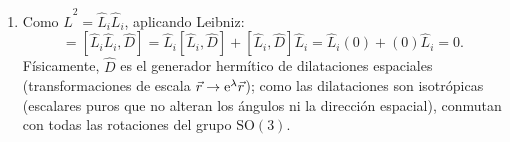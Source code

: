 \begin{appendices}
\begin{enumerate}
    \begin{equation}
        [\hat{L}_i, \hat{D}] = 0, \quad \forall\,i \in \{1, 2, 3\}.
    \end{equation}
    \item Como $\hat{L}^2 = \hat{L}_i\hat{L}_i$, aplicando Leibniz:
    \begin{equation}
        [\hat{L}^2, \hat{D}] = [\hat{L}_i\hat{L}_i, \hat{D}] = \hat{L}_i[\hat{L}_i, \hat{D}] + [\hat{L}_i, \hat{D}]\hat{L}_i = \hat{L}_i(0) + (0)\hat{L}_i = 0.
    \end{equation}
    Físicamente, $\hat{D}$ es el generador hermítico de dilataciones espaciales (transformaciones de escala $\vec{r} \to \mathrm{e}^\lambda\vec{r}$); como las dilataciones son isotrópicas (escalares puros que no alteran los ángulos ni la dirección espacial), conmutan con todas las rotaciones del grupo $\mathrm{SO}(3)$.
\end{enumerate}


\end{appendices}
